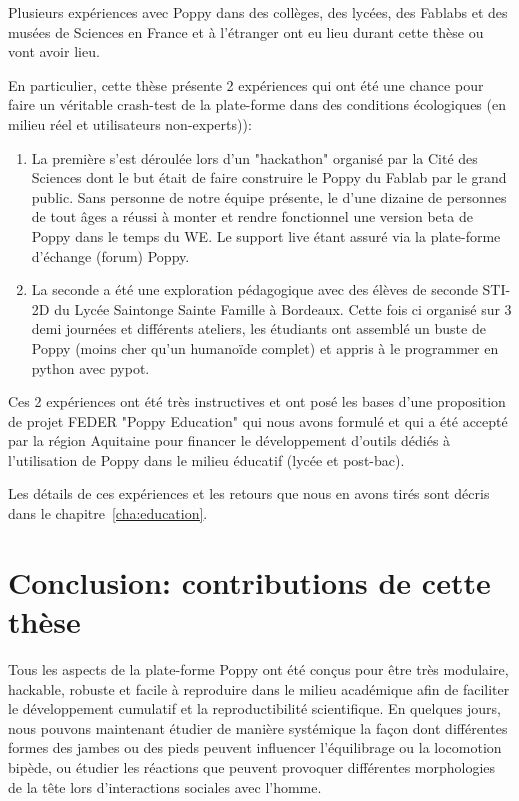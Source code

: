 Plusieurs expériences avec Poppy dans des collèges, des lycées, des Fablabs et des musées de Sciences en France et à l’étranger ont eu lieu durant cette thèse ou vont avoir lieu.

En particulier, cette thèse présente 2 expériences qui ont été une chance pour faire un véritable crash-test de la plate-forme dans des conditions écologiques (en milieu réel et utilisateurs non-experts)):
\begin{enumerate}
    \item La première s'est déroulée lors d'un "hackathon" organisé par la Cité des Sciences dont le but était de faire construire le Poppy du Fablab par le grand public. Sans personne de notre équipe présente, le d'une dizaine de personnes de tout âges a réussi à monter et rendre fonctionnel une version beta de Poppy dans le temps du WE. Le support live étant assuré via la plate-forme d'échange (forum) Poppy.
    \item La seconde a été une exploration pédagogique avec des élèves de seconde STI-2D du Lycée Saintonge Sainte Famille à Bordeaux. Cette fois ci organisé sur 3 demi journées et différents ateliers, les étudiants ont assemblé un buste de Poppy (moins cher qu'un humanoïde complet) et appris à le programmer en python avec pypot.
\end{enumerate}


Ces 2 expériences ont été très instructives et ont posé les bases d'une proposition de projet FEDER "Poppy Education" qui nous avons formulé et qui a été accepté par la région Aquitaine pour financer le développement d'outils dédiés à l'utilisation de Poppy dans le milieu éducatif (lycée et post-bac).

Les détails de ces expériences et les retours que nous en avons tirés sont décris dans le chapitre~\ref{cha:education}.


\section*{Conclusion: contributions de cette thèse} %

Tous les aspects de la plate-forme Poppy ont été conçus pour être très modulaire, hackable, robuste et facile à reproduire dans le milieu académique afin de faciliter le développement cumulatif et la reproductibilité scientifique. En quelques jours, nous pouvons maintenant étudier de manière systémique la façon dont différentes formes des jambes ou des pieds peuvent influencer l'équilibrage ou la locomotion bipède, ou étudier les réactions que peuvent provoquer différentes morphologies de la tête lors d’interactions sociales avec l'homme.

